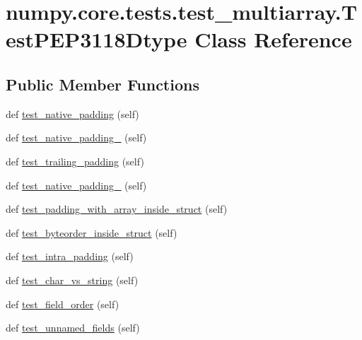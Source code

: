 \hypertarget{classnumpy_1_1core_1_1tests_1_1test__multiarray_1_1TestPEP3118Dtype}{}\section{numpy.\+core.\+tests.\+test\+\_\+multiarray.\+Test\+P\+E\+P3118\+Dtype Class Reference}
\label{classnumpy_1_1core_1_1tests_1_1test__multiarray_1_1TestPEP3118Dtype}
\subsection*{Public Member Functions}
\begin{DoxyCompactItemize}
\item 
def \hyperlink{classnumpy_1_1core_1_1tests_1_1test__multiarray_1_1TestPEP3118Dtype_ae03c18933efa3a87bd621db0f50f1db8}{test\+\_\+native\+\_\+padding} (self)
\item 
def \hyperlink{classnumpy_1_1core_1_1tests_1_1test__multiarray_1_1TestPEP3118Dtype_a0cb638728b75729d290b6c61434d171b}{test\+\_\+native\+\_\+padding\+\_} (self)
\item 
def \hyperlink{classnumpy_1_1core_1_1tests_1_1test__multiarray_1_1TestPEP3118Dtype_a5f8af757b80407020d264b71e0b512f9}{test\+\_\+trailing\+\_\+padding} (self)
\item 
def \hyperlink{classnumpy_1_1core_1_1tests_1_1test__multiarray_1_1TestPEP3118Dtype_aafeae66e6c069fa8526270d07a774563}{test\+\_\+native\+\_\+padding\+\_} (self)
\item 
def \hyperlink{classnumpy_1_1core_1_1tests_1_1test__multiarray_1_1TestPEP3118Dtype_a6d6b6c83935e83aa9d27a982cbdb9794}{test\+\_\+padding\+\_\+with\+\_\+array\+\_\+inside\+\_\+struct} (self)
\item 
def \hyperlink{classnumpy_1_1core_1_1tests_1_1test__multiarray_1_1TestPEP3118Dtype_aba39f6e3162c1096e8b7b82840df12bc}{test\+\_\+byteorder\+\_\+inside\+\_\+struct} (self)
\item 
def \hyperlink{classnumpy_1_1core_1_1tests_1_1test__multiarray_1_1TestPEP3118Dtype_ab17fe2a630f4a1b3cd8ee53d91f2f29a}{test\+\_\+intra\+\_\+padding} (self)
\item 
def \hyperlink{classnumpy_1_1core_1_1tests_1_1test__multiarray_1_1TestPEP3118Dtype_ad7175aaadf77250dbd10ea0b0ee671ae}{test\+\_\+char\+\_\+vs\+\_\+string} (self)
\item 
def \hyperlink{classnumpy_1_1core_1_1tests_1_1test__multiarray_1_1TestPEP3118Dtype_a11f88d520e2adc84d3b17f46665d23d9}{test\+\_\+field\+\_\+order} (self)
\item 
def \hyperlink{classnumpy_1_1core_1_1tests_1_1test__multiarray_1_1TestPEP3118Dtype_a424fbca4dd00701238c9013d2c44c417}{test\+\_\+unnamed\+\_\+fields} (self)
\end{DoxyCompactItemize}


